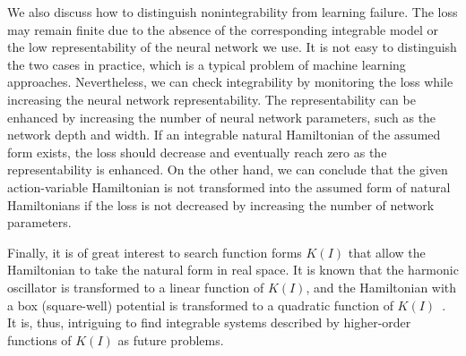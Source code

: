 We also discuss how to distinguish nonintegrability from learning failure.
The loss may remain finite due to the absence of the corresponding integrable model or the low representability of the neural network we use.
It is not easy to distinguish the two cases in practice, which is a typical problem of machine learning approaches. Nevertheless, we can check integrability by monitoring the loss while increasing the neural network representability.
The representability can be enhanced by increasing the number of neural network parameters, such as the network depth and width.
If an integrable natural Hamiltonian of the assumed form exists, the loss should decrease and eventually reach zero as the representability is enhanced.
On the other hand, we can conclude that the given action-variable Hamiltonian is not transformed into the assumed form of natural Hamiltonians if the loss is not decreased by increasing the number of network parameters.

Finally, it is of great interest to search function forms $K(I)$ that allow the Hamiltonian to take the natural form in real space.
It is known that the harmonic oscillator is transformed to a linear function of $K(I)$, and the Hamiltonian with a box (square-well) potential is transformed to a quadratic function of $K(I)$~\cite{Reichl-1992}.
It is, thus, intriguing to find integrable systems described by higher-order functions of $K(I)$ as future problems.
